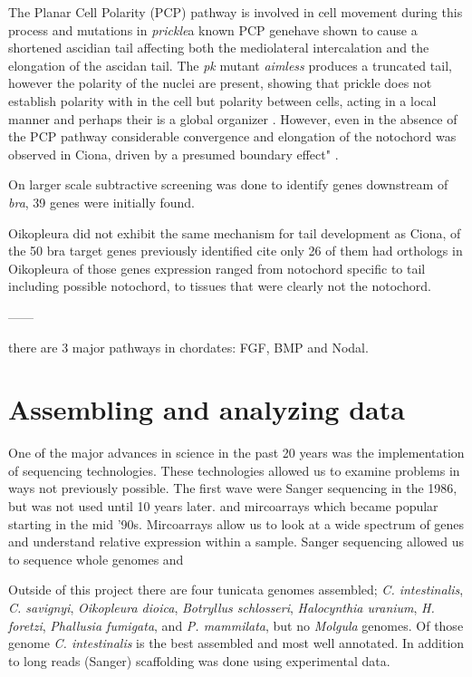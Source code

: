 The Planar Cell Polarity (PCP) pathway is involved in cell movement during this process and mutations in \textit{prickle}\textemdash a known PCP gene\textemdash have shown to cause a shortened ascidian tail affecting both the mediolateral intercalation and the elongation of the ascidan tail\cite{jiang_ascidian_2005}. The \textit{pk} mutant \textit{aimless} produces a truncated tail, however the polarity of the nuclei are present, showing that prickle does not establish polarity with in the cell but polarity between cells, acting in a local manner and perhaps their is a global organizer \cite{jiang_ascidian_2005,kourakis_one-dimensional_2014}. However, even in the absence of the PCP pathway considerable convergence and elongation of the notochord was observed in Ciona, driven by a presumed boundary effect" \cite{veeman_chongmague_2008}.

On larger scale subtractive screening was done to identify genes downstream of \textit{bra}, 39 genes were initially found.

Oikopleura did not exhibit the same mechanism for tail development as Ciona, of the 50 bra target genes previously identified cite only 26 of them had orthologs in Oikopleura \cite{kugler_evolutionary_2011} of those genes expression ranged from notochord specific to tail including possible notochord, to tissues that were clearly not the notochord.

------


there are 3 major pathways in chordates: FGF, BMP and Nodal.


\section{Assembling and analyzing data}
One of the major advances in science in the past 20 years was the implementation of sequencing technologies. These technologies allowed us to examine problems in ways not previously possible. The first wave were Sanger sequencing in the 1986, but was not used until 10 years later. and mircoarrays which became popular starting in the mid '90s. Mircoarrays allow us to look at a wide spectrum of genes and understand relative expression within a sample. Sanger sequencing allowed us to sequence whole genomes and 

Outside of this project there are four tunicata genomes assembled; \textit{C. intestinalis}, \textit{C. savignyi}, \textit{Oikopleura dioica}, \textit{Botryllus schlosseri}, \textit{Halocynthia uranium}, \textit{H. foretzi}, \textit{Phallusia fumigata}, and \textit{P. mammilata}, but no \textit{Molgula} genomes. Of those genome \textit{C. intestinalis} is the best assembled and most well annotated. In addition to long reads (Sanger) scaffolding was done using experimental data.

